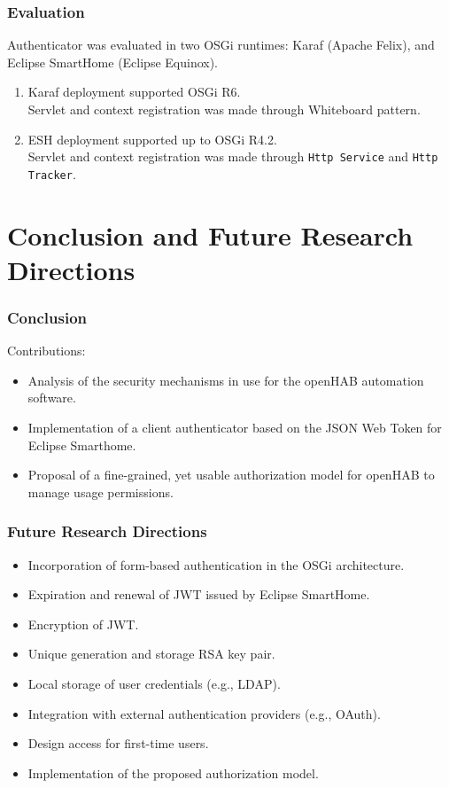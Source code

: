 \documentclass{beamer}
\begin{document}
\begin{frame}
\frametitle{Evaluation}
Authenticator was evaluated in two OSGi runtimes: Karaf (Apache Felix), and Eclipse SmartHome (Eclipse Equinox).
\begin{enumerate}
  \setlength\itemsep{1.5em}
\item Karaf deployment supported OSGi R6. \\ Servlet and context registration was made through Whiteboard pattern. 
\item ESH deployment supported up to OSGi R4.2. \\ Servlet and context registration was made through \texttt{Http Service} and \texttt{Http Tracker}. 
\end{enumerate}
\end{frame}
\section{Conclusion and Future Research Directions}
\begin{frame}
\frametitle{Conclusion}
Contributions:
\begin{itemize}
  \setlength\itemsep{1.5em}
\item Analysis of the security mechanisms in use for the openHAB automation software.
\item Implementation of a client authenticator based on the JSON Web Token for Eclipse Smarthome.
\item Proposal of a fine-grained, yet usable authorization model for openHAB to manage usage permissions.
\end{itemize}
\end{frame}
\begin{frame}
\frametitle{Future Research Directions}
\begin{itemize}
  \setlength\itemsep{0.9em}
\item Incorporation of form-based authentication in the OSGi architecture.
\item Expiration and renewal of JWT issued by Eclipse SmartHome.
\item Encryption of JWT.
\item Unique generation and storage RSA key pair.
\item Local storage of user credentials (e.g., LDAP).
\item Integration with external authentication providers (e.g., OAuth).
\item Design access for first-time users.
\item Implementation of the proposed authorization model.
\end{itemize}

\end{frame}
\end{document}
